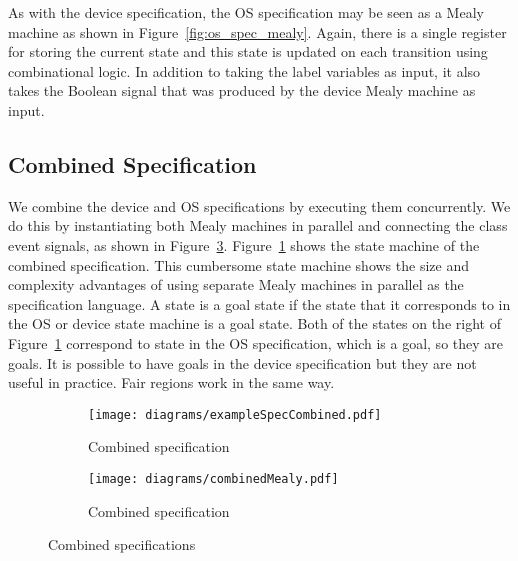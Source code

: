 As with the device specification, the OS specification may be seen as a Mealy machine as shown in Figure~\ref{fig:os_spec_mealy}. Again, there is a single register for storing the current state and this state is updated on each transition using combinational logic. In addition to taking the label variables as input, it also takes the  Boolean signal that was produced by the device Mealy machine as input. 

\subsection{Combined Specification}

We combine the device and OS specifications by executing them concurrently. We do this by instantiating both Mealy machines in parallel and connecting the class event signals, as shown in Figure~\ref{fig:combined_spec_mealy}. Figure~\ref{fig:combined_spec} shows the state machine of the combined specification. This cumbersome state machine shows the size and complexity advantages of using separate Mealy machines in parallel as the specification language. A state is a goal state if the state that it corresponds to in the OS or device state machine is a goal state. Both of the states on the right of Figure~\ref{fig:combined_spec} correspond to state  in the OS specification, which is a goal, so they are goals. It is possible to have goals in the device specification but they are not useful in practice. Fair regions work in the same way.

\begin{figure}
\centering
\begin{subfigure}[t]{0.47\textwidth}
\texttt{[image: diagrams/exampleSpecCombined.pdf]}
\caption{Combined specification}
\label{fig:combined_spec}
\end{subfigure}
\hfill
\begin{subfigure}[t]{0.47\textwidth}
\texttt{[image: diagrams/combinedMealy.pdf]}
\caption{Combined specification}
\label{fig:combined_spec_mealy}
\end{subfigure}
\caption{Combined specifications}
\end{figure}

